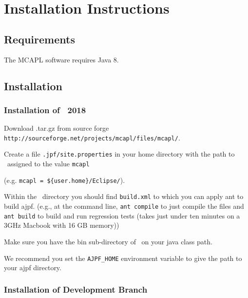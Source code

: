 \chapter{Installation Instructions}
\label{chap:installation}
\section{Requirements}

The MCAPL software requires Java 8.  

\section{Installation}

\subsection{Installation of \ajpf\ 2018}

\begin{itemize}
\begin{sloppypar}
\item Download \ajpfversion.tar.gz from source forge \texttt{http://sourceforge.net/projects/mcapl/files/mcapl/}.
\end{sloppypar}
\item Create a file \texttt{.jpf/site.properties} in your home directory with the path to \ajpfversion\ assigned to the value \texttt{mcapl}

  (e.g. \texttt{mcapl = \$\{user.home\}/Eclipse/\ajpfversion}).
\item Within the \ajpfversion\ directory you should find \texttt{build.xml} to which you can apply ant to build ajpf. (e.g., at the command line, \lstinline{ant compile} to just compile the files and \lstinline{ant build} to build and run regression tests (takes just under ten minutes on a 3GHz Macbook with 16 GB memory))
\item Make sure you have the bin sub-directory of \ajpfversion\ on your java class path.
\item We recommend you set the \texttt{AJPF\_HOME} environment variable to give the path to your ajpf directory.
\end{itemize}

\subsection{Installation of Development Branch}

